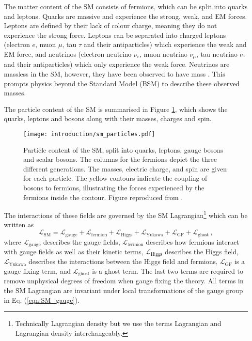 \documentclass[main.tex]{subfiles}
\begin{document}
    The matter content of the SM consists of fermions, which can be split
    into quarks and leptons. Quarks are massive and experience the strong,
    weak, and EM forces. Leptons are defined by their lack of colour charge,
    meaning they do not experience the strong force. Leptons can be separated
    into charged leptons (electron $e$, muon $\mu$, tau $\tau$
    and their antiparticles) which experience the weak and EM force, and 
    neutrinos (electron neutrino $\nu_{e}$, muon neutrino $\nu_{\mu}$, tau
    neutrino $\nu_{\tau}$ and their antiparticles) which only experience the
    weak force. Neutrinos are massless in the SM, however, they have been
    observed to have mass \cite{Super-Kamiokande:1998kpq,SNO:2002tuh}. This
    prompts physics beyond the Standard Model (BSM) to describe these observed masses.

    The particle content of the SM is summarised in Figure \ref{fig:SM_particles},
    which shows the quarks, leptons and bosons along with their masses, charges
    and spin.
    \begin{figure}
        \texttt{[image: introduction/sm\_particles.pdf]}
        \caption{Particle content of the SM, split into quarks, leptons,
        gauge bosons and scalar bosons. The columns for the fermions depict
        the three different generations. The masses, electric charge, and spin
        are given for each particle. The yellow contours indicate the coupling
        of bosons to fermions, illustrating the forces experienced by the
        fermions inside the contour. Figure reproduced from \cite{SM_figure}.}
        \label{fig:SM_particles}
    \end{figure}
    The interactions of these fields are governed by the SM Lagrangian\footnote{Technically Lagrangian density but we use the terms
    Lagrangian and Lagrangian density interchangeably.}
    which can be written as
    \begin{equation}\label{eqn:L_SM}
        \mathcal{L}_{\mathrm{SM}} = \mathcal{L}_{\mathrm{gauge}} + \mathcal{L}_{\mathrm{fermion}} + \mathcal{L}_{\mathrm{Higgs}} + \mathcal{L}_{\mathrm{Yukawa}} + \mathcal{L}_{\mathrm{GF}} + \mathcal{L}_{\mathrm{ghost}} \, ,
    \end{equation}
    where $\mathcal{L}_{\mathrm{gauge}}$ describes the gauge fields,
    $\mathcal{L}_{\mathrm{fermion}}$ describes how fermions interact with
    gauge fields as well as their kinetic terms,
    $\mathcal{L}_{\mathrm{Higgs}}$ describes the Higgs field,
    $\mathcal{L}_{\mathrm{Yukawa}}$ describes the interactions between the Higgs
    field and fermions,
    $\mathcal{L}_{\mathrm{GF}}$ is a gauge fixing term,
    and $\mathcal{L}_{\mathrm{ghost}}$ is a ghost term.
    The last two terms are required to remove unphysical degrees of freedom
    when gauge fixing the theory.
    All terms in the SM Lagrangian are invariant under local transformations
    of the gauge group in Eq. (\ref{eqn:SM_gauge}).
\end{document}
